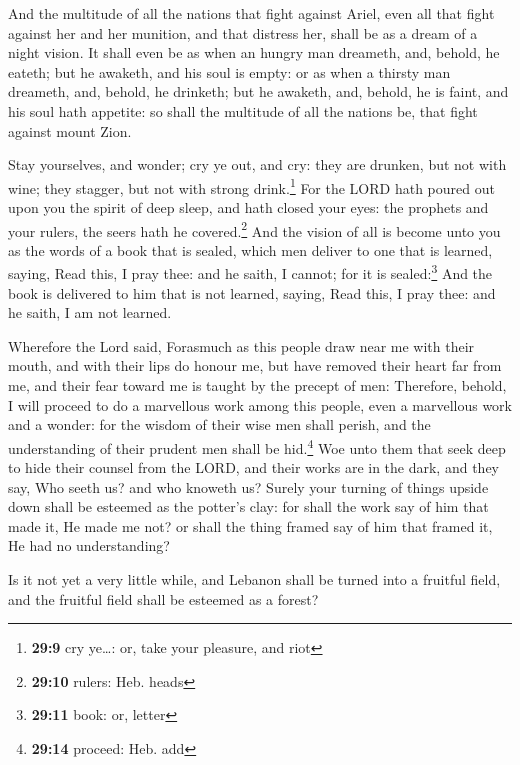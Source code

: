  And the multitude of all the nations that fight against
Ariel, even all that fight against her and her munition, and that
distress her, shall be as a dream of a night vision.  It
shall even be as when an hungry man dreameth, and, behold, he eateth;
but he awaketh, and his soul is empty: or as when a thirsty man
dreameth, and, behold, he drinketh; but he awaketh, and, behold, he is
faint, and his soul hath appetite: so shall the multitude of all the
nations be, that fight against mount Zion.

 Stay yourselves, and wonder; cry ye out, and cry: they
are drunken, but not with wine; they stagger, but not with strong
drink.\footnote{\textbf{29:9} cry ye\ldots: or, take your pleasure, and
  riot}  For the LORD hath poured out upon you the spirit
of deep sleep, and hath closed your eyes: the prophets and your rulers,
the seers hath he covered.\footnote{\textbf{29:10} rulers: Heb. heads}
 And the vision of all is become unto you as the words of
a book that is sealed, which men deliver to one that is learned, saying,
Read this, I pray thee: and he saith, I cannot; for it is
sealed:\footnote{\textbf{29:11} book: or, letter}  And
the book is delivered to him that is not learned, saying, Read this, I
pray thee: and he saith, I am not learned.

 Wherefore the Lord said, Forasmuch as this people draw
near me with their mouth, and with their lips do honour me, but have
removed their heart far from me, and their fear toward me is taught by
the precept of men:  Therefore, behold, I will proceed to
do a marvellous work among this people, even a marvellous work and a
wonder: for the wisdom of their wise men shall perish, and the
understanding of their prudent men shall be hid.\footnote{\textbf{29:14}
  proceed: Heb. add}  Woe unto them that seek deep to
hide their counsel from the LORD, and their works are in the dark, and
they say, Who seeth us? and who knoweth us?  Surely your
turning of things upside down shall be esteemed as the potter's clay:
for shall the work say of him that made it, He made me not? or shall the
thing framed say of him that framed it, He had no understanding?

 Is it not yet a very little while, and Lebanon shall be
turned into a fruitful field, and the fruitful field shall be esteemed
as a forest?


